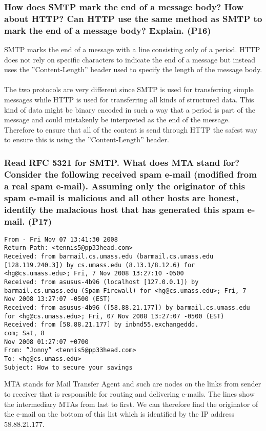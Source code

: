 \subsubsection{How does SMTP mark the end of a message body? How about HTTP? Can HTTP use the same method as SMTP to mark the end of a message body? Explain. (P16)}

SMTP marks the end of a message with a line consisting only of a period. HTTP does not rely on specific characters to indicate the end of a message but instead uses the ''Content-Length'' header used to specify the length of the message body. \\
\\
The two protocols are very different since SMTP is used for transferring simple messages while HTTP is used for transferring all kinds of structured data. This kind of data might be binary encoded in such a way that a period is part of the message and could mistakenly be interpreted as the end of the message. Therefore to ensure that all of the content is send through HTTP the safest way to ensure this is using the ''Content-Length'' header.

\subsubsection{Read RFC 5321 for SMTP. What does MTA stand for? Consider the following received spam e-mail (modified from a real spam e-mail). Assuming only the originator of this spam e-mail is malicious and all other hosts are honest, identify the malacious host that has generated this spam e-mail. (P17)}

\begin{verbatim}
From - Fri Nov 07 13:41:30 2008
Return-Path: <tennis5@pp33head.com>
Received: from barmail.cs.umass.edu (barmail.cs.umass.edu
[128.119.240.3]) by cs.umass.edu (8.13.1/8.12.6) for
<hg@cs.umass.edu>; Fri, 7 Nov 2008 13:27:10 -0500
Received: from asusus-4b96 (localhost [127.0.0.1]) by
barmail.cs.umass.edu (Spam Firewall) for <hg@cs.umass.edu>; Fri, 7
Nov 2008 13:27:07 -0500 (EST)
Received: from asusus-4b96 ([58.88.21.177]) by barmail.cs.umass.edu
for <hg@cs.umass.edu>; Fri, 07 Nov 2008 13:27:07 -0500 (EST)
Received: from [58.88.21.177] by inbnd55.exchangeddd.
com; Sat, 8
Nov 2008 01:27:07 +0700
From: ”Jonny” <tennis5@pp33head.com>
To: <hg@cs.umass.edu>
Subject: How to secure your savings
\end{verbatim}
\noindent
MTA stands for Mail Transfer Agent and such are nodes on the links from sender to receiver that is responsible for routing and delivering e-mails. The lines show the intermediary MTAs from last to first. We can therefore find the originator of the e-mail on the bottom of this list which is identified by the IP address 58.88.21.177.


